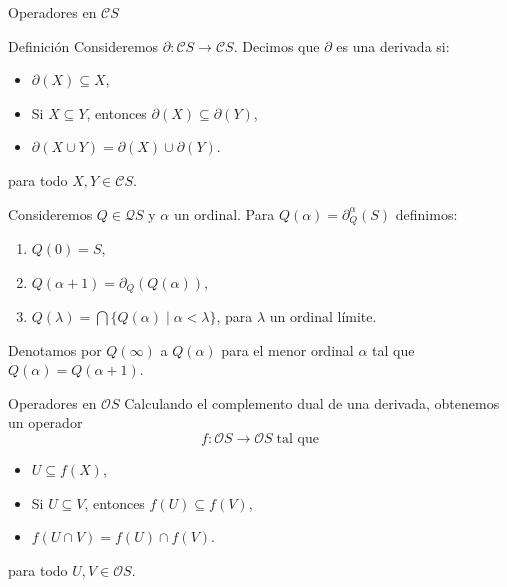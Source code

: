 \documentclass[compress,12pt]{beamer}
\begin{document}
\begin{frame}{Operadores en $\mathcal{C}S$}
    \begin{block}{Definición}
Consideremos $\partial\colon \mathcal{C}S\to \mathcal{C}S$. Decimos que $\partial$ es una derivada si:
\begin{itemize}
\item $\partial(X)\subseteq X$,
\item Si $X\subseteq Y$, entonces $\partial(X)\subseteq \partial(Y)$,
\item $\partial(X\cup Y)=\partial(X)\cup \partial(Y)$.
\end{itemize}
para todo $X,Y\in \mathcal{C}S$.
\end{block}

\vspace{2mm}


\end{frame}

\begin{frame}
Consideremos $Q\in \mathcal{Q}S$ y $\alpha$ un ordinal. Para $Q(\alpha)=\partial_Q^\alpha(S)$ definimos:
\begin{enumerate}
\item $Q(0)=S$,
\item $Q(\alpha+1)=\partial_Q(Q(\alpha))$,
\item $Q(\lambda)=\bigcap\{Q(\alpha)\mid \alpha<\lambda\}$, para $\lambda$ un ordinal límite.
\end{enumerate}
\vspace{2mm}

Denotamos por $Q(\infty)$ a $Q(\alpha)$ para el menor ordinal $\alpha$ tal que $Q(\alpha)=Q(\alpha+1)$.
\vspace{2mm}


\end{frame}

\begin{frame}{Operadores en $\mathcal{O}S$}
Calculando el complemento dual de una derivada, obtenemos un operador 
\[
f\colon \mathcal{O}S\to \mathcal{O}S \; \text{tal que}
\]
\begin{itemize}
\item $U\subseteq f(X)$,
\item Si $U\subseteq V$, entonces $f(U)\subseteq f(V)$,
\item $f(U\cap V)=f(U)\cap f(V)$.
\end{itemize}
para todo $U,V\in \mathcal{O}S$.

\vspace{2mm}

\end{frame}
\end{document}
